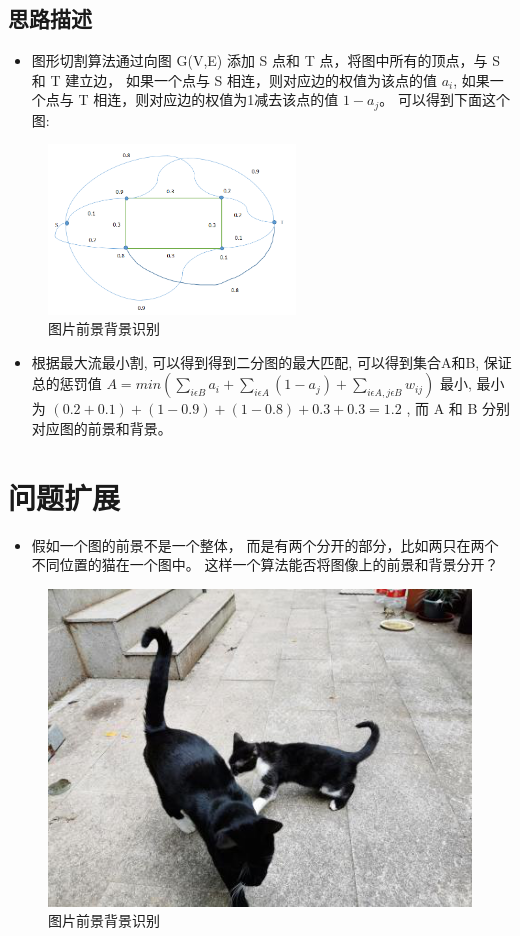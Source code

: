 \subsection{思路描述}
\begin{itemize}
    \item 图形切割算法通过向图 G(V,E) 添加 S 点和 T 点，将图中所有的顶点，与 S 和 T 建立边，
          如果一个点与 S 相连，则对应边的权值为该点的值 $a_i$, 如果一个点与 T 相连，则对应边的权值为1减去该点的值 $ 1 - a_j $。
          可以得到下面这个图:
\end{itemize}

\begin{figure}[htb]
    \centering
    \includegraphics[height=4.5cm]{image/Image-segmentation3.png}
    \caption{图片前景背景识别}\label{fig2}
\end{figure}

\begin{itemize}
    \item   根据最大流最小割, 可以得到得到二分图的最大匹配, 可以得到集合A和B, 保证总的惩罚值 $ A = min\left(\sum_{i \epsilon B}a_i +  \sum_{i \epsilon A}(1 - a_j) + \sum_{i \epsilon A, j \epsilon B}w_{ij} \right) $ 最小, 
            最小为 $(0.2 + 0.1) + (1 - 0.9) + (1 - 0.8) + 0.3 + 0.3 = 1.2 $ , 而 A 和 B 分别对应图的前景和背景。
\end{itemize}



\section{问题扩展}
\begin{itemize}
    \item 假如一个图的前景不是一个整体，
          而是有两个分开的部分，比如两只在两个不同位置的猫在一个图中。
          这样一个算法能否将图像上的前景和背景分开？
\end{itemize}

\begin{figure}[htb]
	\centering
	\includegraphics[scale=0.6]{image/Image-segmentation1.png}
	\caption{图片前景背景识别}\label{fig3}
\end{figure}